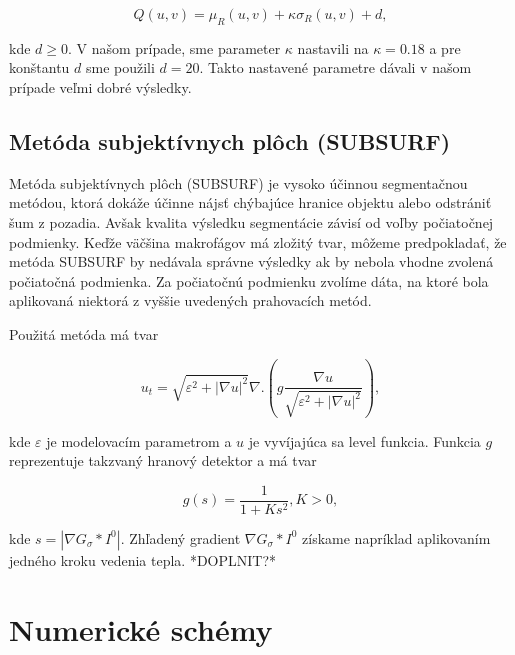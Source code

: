 \documentclass[a4paper,12pt,twoside]{article}%
\def\epsilon{\varepsilon}
\begin{document}
\begin{equation}
Q(u,v) = \mu_R(u,v) + \kappa\sigma_R(u,v) + d,
\end{equation}

kde $d \geq 0$. V našom prípade, sme parameter $\kappa$ nastavili na $\kappa = 0.18$ a pre konštantu $d$ sme použili $d = 20$. Takto nastavené parametre dávali v našom prípade veľmi dobré výsledky.


\subsection{Metóda subjektívnych plôch (SUBSURF)} 

Metóda subjektívnych plôch (SUBSURF) je vysoko účinnou segmentačnou metódou, ktorá dokáže účinne nájsť chýbajúce hranice objektu alebo odstrániť šum z pozadia. Avšak kvalita výsledku segmentácie závisí od voľby počiatočnej podmienky. Keďže väčšina makrofágov má zložitý tvar, môžeme predpokladať, že metóda SUBSURF by nedávala správne výsledky ak by nebola vhodne zvolená počiatočná podmienka. Za počiatočnú podmienku zvolíme dáta, na ktoré bola aplikovaná niektorá z vyššie uvedených prahovacích metód.

Použitá metóda má tvar

\begin{equation} \label{eq:subsurf}
u_t = \sqrt{\epsilon^2 + |\nabla u|^2}\nabla.(g \frac{\nabla u}{\sqrt{\epsilon^2 + |\nabla u|^2}}),
\end{equation}

kde $\epsilon$ je modelovacím parametrom a $u$ je vyvíjajúca sa level funkcia. Funkcia $g$ reprezentuje takzvaný hranový detektor a má tvar

\begin{equation}
g(s) = \frac{1}{1+Ks^2}, K > 0,
\end{equation}

kde $s = |\nabla G_\sigma*I^0|$. Zhľadený gradient $\nabla G_\sigma*I^0$ získame napríklad aplikovaním jedného kroku vedenia tepla. *DOPLNIT?*




\newpage
\section{Numerické schémy}
\end{document}
